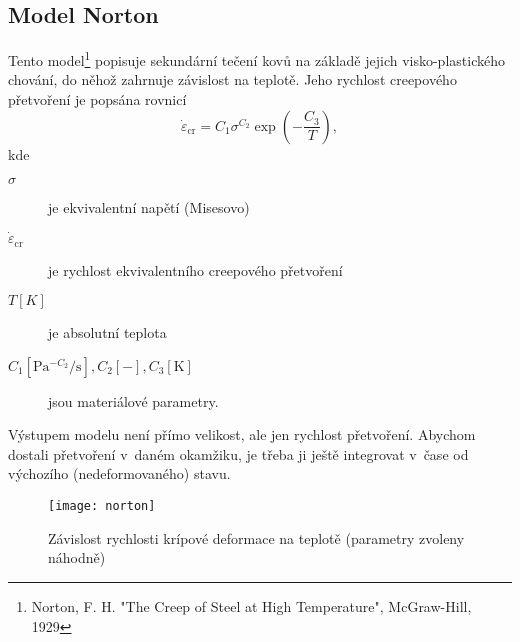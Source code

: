 

\subsection{Model Norton}\label{sec:norton}
Tento model\footnote{Norton, F. H. "The Creep of Steel at High Temperature", McGraw-Hill, 1929} popisuje sekundární tečení kovů na základě jejich visko-plastického chování, do něhož zahrnuje závislost na teplotě.
Jeho rychlost creepového přetvoření je popsána rovnicí
\begin{equation}
	\dot{\varepsilon}_\text{cr} = C_1 \sigma^{C_2} \exp\left(-\frac{C_3}{T}\right),
\end{equation}
kde
\begin{description}
	\item[$\sigma$] je ekvivalentní napětí (Misesovo)
	\item[$\dot{\varepsilon}_\text{cr}$]je rychlost ekvivalentního creepového přetvoření
	\item[{$T [K]$}] je absolutní teplota
	\item[{$C_1 [\si{\pascal^{-C_2}\per\second}], C_2 [-], C_3 [\si{\kelvin}]$}] jsou materiálové parametry.
\end{description}

Výstupem modelu není přímo velikost, ale jen rychlost přetvoření.
Abychom dostali přetvoření v~daném okamžiku, je třeba ji ještě integrovat v~čase od výchozího (nedeformovaného) stavu.

\begin{figure}[H]
	\centering
	\texttt{[image: norton]}
	\caption{Závislost rychlosti krípové deformace na teplotě (parametry zvoleny náhodně)}
	\label{fig:model-norton}
\end{figure}
